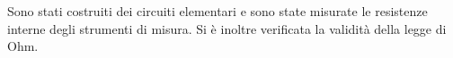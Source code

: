 Sono stati costruiti dei circuiti elementari e sono state misurate le
resistenze interne degli strumenti di misura. Si è inoltre verificata
la validità della legge di Ohm.